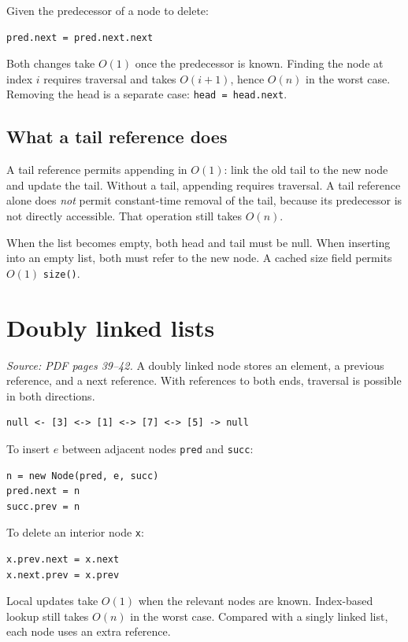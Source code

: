 \documentclass[11pt,letterpaper]{article}
\newcommand{\sourcepages}[1]{\textit{Source: PDF pages #1.}}
\newcommand{\method}[1]{\texttt{#1}}
\begin{document}
Given the predecessor of a node to delete:
\par\noindent\begin{minipage}{\linewidth}
\begin{lstlisting}
pred.next = pred.next.next
\end{lstlisting}
\end{minipage}\par
Both changes take $O(1)$ once the predecessor is known. Finding the node at index $i$ requires traversal and takes $O(i+1)$, hence $O(n)$ in the worst case. Removing the head is a separate case: \method{head = head.next}.

\subsection{What a tail reference does}
A tail reference permits appending in $O(1)$: link the old tail to the new node and update the tail. Without a tail, appending requires traversal. A tail reference alone does \emph{not} permit constant-time removal of the tail, because its predecessor is not directly accessible. That operation still takes $O(n)$.

When the list becomes empty, both head and tail must be null. When inserting into an empty list, both must refer to the new node. A cached size field permits $O(1)$ \method{size()}.

\section{Doubly linked lists}
\sourcepages{39--42}
A doubly linked node stores an element, a previous reference, and a next reference. With references to both ends, traversal is possible in both directions.
\par\noindent\begin{minipage}{\linewidth}
\begin{lstlisting}
null <- [3] <-> [1] <-> [7] <-> [5] -> null
\end{lstlisting}
\end{minipage}\par
To insert $e$ between adjacent nodes \method{pred} and \method{succ}:
\par\noindent\begin{minipage}{\linewidth}
\begin{lstlisting}
n = new Node(pred, e, succ)
pred.next = n
succ.prev = n
\end{lstlisting}
\end{minipage}\par
To delete an interior node \method{x}:
\par\noindent\begin{minipage}{\linewidth}
\begin{lstlisting}
x.prev.next = x.next
x.next.prev = x.prev
\end{lstlisting}
\end{minipage}\par
Local updates take $O(1)$ when the relevant nodes are known. Index-based lookup still takes $O(n)$ in the worst case. Compared with a singly linked list, each node uses an extra reference.
\end{document}
